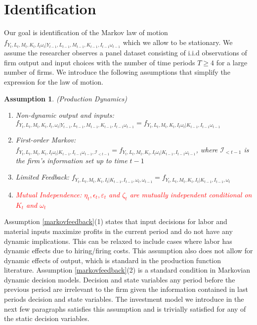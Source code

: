 \documentclass{article}
\newtheorem{assump}{Assumption}[section]
\begin{document}

\section{Identification}

Our goal is identification of the Markov law of motion $f_{Y_{t}, L_{t}, M_{t}, K_{t}, I_{t} \omega_{t}|Y_{t-1}, L_{t-1}, M_{t-1}, K_{t-1}, I_{t-1} \omega_{t-1}}$ which we allow to be stationary. We assume the researcher observes a panel dataset consisting of i.i.d observations of firm output and input choices with the number of time periods $T\geq 4$ for a large number of firms. We introduce the following assumptions that simplify the expression for the law of motion. 

\begin{assump}(Production Dynamics)\label{markovfeedback}
~
    \begin{enumerate}
        \item \textit{Non-dynamic output and inputs:} $f_{Y_{t}, L_{t}, M_{t}, K_{t}, I_{t}, \omega_{t}|Y_{t-1}, L_{t-1}, M_{t-1}, K_{t-1}, I_{t-1} \omega_{t-1}}=f_{Y_{t}, L_{t}, M_{t}, K_{t}, I_{t} \omega_{t}|K_{t-1}, I_{t-1} \omega_{t-1}}$
        \item \textit{First-order Markov:} $f_{Y_{t}, L_{t}, M_{t}, K_{t}, I_{t} \omega_{t}|K_{t-1}, I_{t-1} \omega_{t-1}, \mathcal{I}_{<t-1}}=f_{Y_{t}, L_{t}, M_{t}, K_{t}, I_{t} \omega_{t}|K_{t-1}, I_{t-1} \omega_{t-1}}$, where $\mathcal{I}_{<t-1}$ is the firm's information set up to time $t-1$
        \item \textit{Limited Feedback:} $f_{Y_{t}, L_{t}, M_{t}, K_{t}, I_{t}|K_{t-1}, I_{t-1}, \omega_{t}, \omega_{t-1}}=f_{Y_{t}, L_{t}, M_{t}, K_{t}, I_{t}|K_{t-1}, I_{t-1}, \omega_{t}}$ 
        \item \textcolor{red}{\textit{Mutual Independence:} $\eta_{t}, \epsilon_{t}, \varepsilon_{t}$ and $\zeta_{t}$ are mutually independent conditional on $K_{t}$ and $\omega_{t}$}
    \end{enumerate}
\end{assump}

Assumption \eqref{markovfeedback}(1) states that input decisions for labor and material inputs maximize profits in the current period and do not have any dynamic implications. This can be relaxed to include cases where labor has dynamic effects due to hiring/firing costs. This assumption also does not allow for dynamic effects of output, which is standard in the production function literature. Assumption \eqref{markovfeedback}(2) is a standard condition in Markovian dynamic decision models. Decision and state variables any period before the previous period are irrelevant to the firm given the information contained in last periods decision and state variables. The investment model we introduce in the next few paragraphs satisfies this assumption and is trivially satisfied for any of the static decision variables.\\
\end{document}
